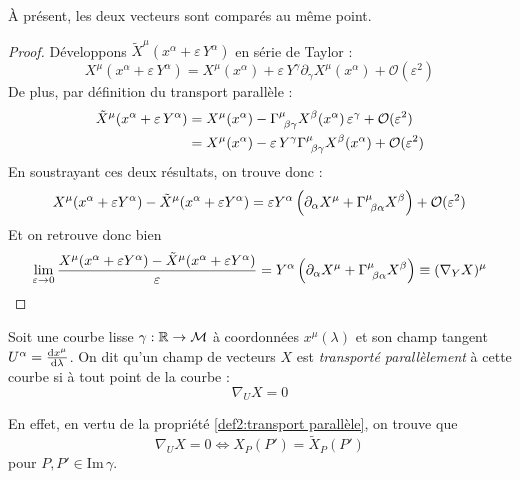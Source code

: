 \begin{rmk}
    À présent, les deux vecteurs sont comparés au même point.
\end{rmk}
\begin{proof}
    Développons $\tilde{X}^{\mu}(x^{\alpha} +\varepsilon \, Y^{\alpha} )$ en série de Taylor :
    \begin{equation}
        X^{\mu}(x^{\alpha} + \varepsilon\, Y^{\alpha} ) =X^{\mu}(x^{\alpha}) + \varepsilon \,Y^{\gamma}\partial_{\gamma}X^{\mu}(x^\alpha) + \mathcal{O}(\varepsilon^{2}) 
    \end{equation}
    De plus, par définition du transport parallèle :
    \begin{align}
        \tilde{X}^{\mu}(x^{\alpha} +\varepsilon \,Y^{\alpha} ) &= X^{\mu}(x^{\alpha}) - \Gamma\indices{^{\mu}_{\!\beta \gamma}}X^{\beta}(x^\alpha)\,\varepsilon^{\gamma} + \mathcal{O}(\varepsilon^2)\\
        & = X^{\mu}(x^{\alpha}) - \varepsilon\, Y^\gamma \Gamma\indices{^{\mu}_{\!\beta \gamma}}X^{\beta}(x^\alpha) + \mathcal{O}(\varepsilon^2)
    \end{align}
    En soustrayant ces deux résultats, on trouve donc :
    \begin{equation}
        X^{\mu}(x^{\alpha} + \varepsilon Y^{\alpha} ) - \tilde{X}^{\mu}(x^{\alpha} +\varepsilon Y^{\alpha} ) = \varepsilon Y^\alpha \lt \partial_\alpha X^\mu + \Gamma\indices{^{\mu}_{\!\beta \alpha}} X^\beta\rt+ \mathcal{O}(\varepsilon^2)
    \end{equation}
    Et on retrouve donc bien 
    \begin{equation}
        \lim_{\varepsilon\to 0} \frac{X^{\mu}(x^{\alpha} + \varepsilon Y^{\alpha} ) - \tilde{X}^{\mu}(x^{\alpha} +\varepsilon Y^{\alpha} )}{\varepsilon} = Y^\alpha \lt \partial_\alpha X^\mu + \Gamma\indices{^{\mu}_{\!\beta \alpha}} X^\beta\rt \equiv (\nabla_Y X)^\mu
    \end{equation}
\end{proof}
\begin{theoremframe}
\begin{defi}
    Soit une courbe lisse $\gamma: \mathbb{R} \to \mathcal{M}$ à coordonnées $x^\mu(\lambda)$ et son champ tangent $U^\alpha = \frac{\mathrm{d} x^\mu}{\mathrm{d} \lambda}$. On dit qu'un champ de vecteurs $X$ est \emph{transporté parallèlement} à cette courbe si à tout point de la courbe :
    \begin{equation}
        \nabla_U X = 0
    \end{equation}
\end{defi}
\end{theoremframe}
En effet, en vertu de la propriété \ref{def2:transport parallèle}, on trouve que
\begin{equation}
    \nabla_U X = 0 \iff X_P(P') = \tilde{X}_P(P')
\end{equation}
pour $P,P' \in \mathrm{Im} \, \gamma$. 

